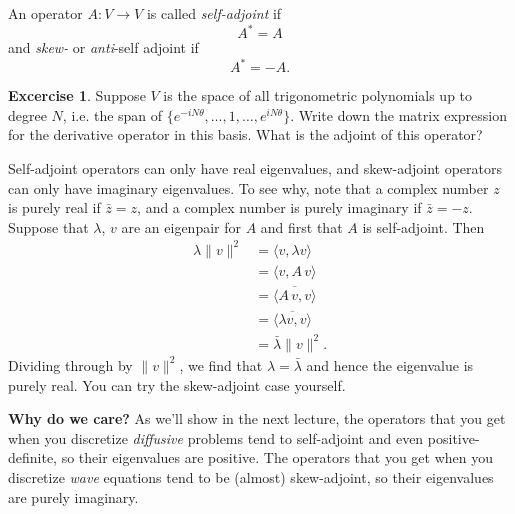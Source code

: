 \documentclass{article}
\theoremstyle{definition}
\newtheorem*{exc}{Excercise}
\theoremstyle{plain}
\begin{document}
An operator $A : V \to V$ is called \emph{self-adjoint} if
\begin{equation}
    A^* = A
\end{equation}
and \emph{skew-} or \emph{anti}-self adjoint if
\begin{equation}
    A^* = -A.
\end{equation}

\begin{exc}
    Suppose $V$ is the space of all trigonometric polynomials up to degree $N$, i.e. the span of $\{e^{-iN\theta}, \ldots, 1, \ldots, e^{iN\theta}\}$.
    Write down the matrix expression for the derivative operator in this basis.
    What is the adjoint of this operator?
\end{exc}

Self-adjoint operators can only have real eigenvalues, and skew-adjoint operators can only have imaginary eigenvalues.
To see why, note that a complex number $z$ is purely real if $\bar z = z$, and a complex number is purely imaginary if $\bar z = -z$.
Suppose that $\lambda$, $v$ are an eigenpair for $A$ and first that $A$ is self-adjoint.
Then
\begin{align}
    \lambda \|v\|^2 & = \langle v, \lambda v\rangle \nonumber\\
    & = \langle v, A\,v\rangle \nonumber\\
    & = \overline{\langle A\, v, v\rangle} \nonumber\\
    & = \overline{\langle \lambda v, v\rangle} \nonumber\\
    & = \bar\lambda\|v\|^2.
\end{align}
Dividing through by $\|v\|^2$, we find that $\lambda = \bar\lambda$ and hence the eigenvalue is purely real.
You can try the skew-adjoint case yourself.

\textbf{Why do we care?}
As we'll show in the next lecture, the operators that you get when you discretize \emph{diffusive} problems tend to self-adjoint and even positive-definite, so their eigenvalues are positive.
The operators that you get when you discretize \emph{wave} equations tend to be (almost) skew-adjoint, so their eigenvalues are purely imaginary.
\end{document}
